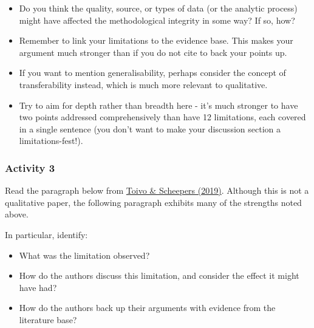 \documentclass[
  english,
  letterpaper,
  DIV=11,
  numbers=noendperiod]{scrreprt}
\providecommand{\tightlist}{%
  \setlength{\itemsep}{0pt}\setlength{\parskip}{0pt}}
\begin{document}
\begin{itemize}
\tightlist
\item
  Do you think the quality, source, or types of data (or the analytic
  process) might have affected the methodological integrity in some way?
  If so, how?
\item
  Remember to link your limitations to the evidence base. This makes
  your argument much stronger than if you do not cite to back your
  points up.
\item
  If you want to mention generalisability, perhaps consider the concept
  of transferability instead, which is much more relevant to
  qualitative.
\item
  Try to aim for depth rather than breadth here - it's much stronger to
  have two points addressed comprehensively than have 12 limitations,
  each covered in a single sentence (you don't want to make your
  discussion section a limitations-fest!).
\end{itemize}

\subsubsection{Activity 3}\label{activity-3}

Read the paragraph below from
\href{https://journals.plos.org/plosone/article?id=10.1371/journal.pone.0210450}{Toivo
\& Scheepers (2019)}. Although this is not a qualitative paper, the
following paragraph exhibits many of the strengths noted above.

In particular, identify:

\begin{itemize}
\tightlist
\item
  What was the limitation observed?
\item
  How do the authors discuss this limitation, and consider the effect it
  might have had?
\item
  How do the authors back up their arguments with evidence from the
  literature base?
\end{itemize}
\end{document}
